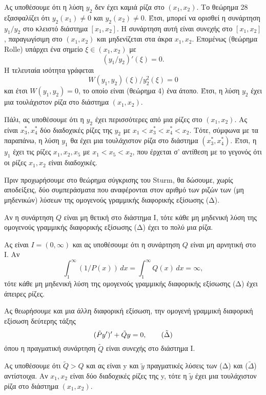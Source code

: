 \documentclass[11pt,a4paper,twoside]{book}
\newcommand{\titlefont}[1]{{\fontfamily{maksf}\selectfont #1}}
\newcounter{thewrhma}[chapter]
\renewcommand{\thethewrhma}{\thechapter.\arabic{thewrhma}}
\newcommand{\thewr}{\refstepcounter{thewrhma}{\bf\titlefont{\textcolor{secondarycolor}{\large Θεώρημα\hspace{2mm}\thethewrhma}}}\hspace{1mm}}{}
\newenvironment{Thewrhma}[1]
{\begin{tcolorbox}[title=\thewr\ \ :\ \  {\textcolor{black}{\bf{\large\titlefont{#1}}}},
breakable,
enhanced standard,
titlerule=-.2pt,
toprule=0pt, 
rightrule=0pt, 
bottomrule=0pt,
colback=white,
left=2mm,
top=1mm,
bottom=0mm,
boxrule=0pt,
colframe=white,
borderline west={1.5mm}{0pt}{secondarycolor},
leftrule=2mm,
sharp corners,
coltitle=secondarycolor]}
{\end{tcolorbox}}
\newcommand{\eng}[1]{\selectlanguage{english}#1\selectlanguage{greek}}
\begin{document}
Ας υποθέσουμε ότι η λύση $y_2$ δεν έχει καμιά ρίζα στο $(x_1,x_2)$. Το θεώρημα 28 εξασφαλίζει ότι $y_2(x_1)\neq 0$ και $y_2(x_2)\neq 0$. Έτσι, μπορεί να ορισθεί η συνάρτηση $y_1/y_2$ στο κλειστό διάστημα $[x_1,x_2]$. Η συνάρτηση αυτή είναι συνεχής στο $[x_1,x_2]$, παραγωγίσιμη στο $(x_1,x_2)$ και μηδενίζεται στα άκρα $x_1, x_2$. Επομένως (θεώρημα Rolle) υπάρχει ένα σημείο $\xi \in (x_1,x_2)$ με
\[ (y_1/y_2)'(\xi)=0. \]
Η τελευταία ισότητα γράφεται
\[ W(y_1,y_2)(\xi)/y_2^2(\xi)=0 \]
και έτσι $W(y_1,y_2)=0$, το οποίο είναι (θεώρημα 4) ένα άτοπο. Έτσι, η λύση $y_2$ έχει μια τουλάχιστον ρίζα στο διάστημα $(x_1,x_2)$.

Πάλι, ας υποθέσουμε ότι η $y_2$ έχει περισσότερες από μια ρίζες στο $(x_1,x_2)$. Ας είναι $x_3^*, x_4^*$ δύο διαδοχικές ρίζες της $y_2$ με $x_1<x_3^*<x_4^*<x_2$. Τότε, σύμφωνα με τα παραπάνω, η λύση $y_1$ θα έχει μια τουλάχιστον ρίζα στο διάστημα $(x_3^*,x_4^*)$. Έτσι, η $y_1$ έχει τις ρίζες $x_1,x_2,x_5$ με $x_1<x_5<x_2$, που έρχεται σ' αντίθεση με το γεγονός ότι οι ρίζες $x_1, x_2$ είναι διαδοχικές.

\vspace{5mm}
Πριν προχωρήσουμε στο θεώρημα σύγκρισης του \eng{Sturm}, θα δώσουμε, χωρίς αποδείξεις, δύο συμπεράσματα που αναφέρονται στον αριθμό των ριζών των (μη μηδενικών) λύσεων της ομογενούς γραμμικής διαφορικής εξίσωσης (Δ).
\begin{Alist}
    \item Αν η συνάρτηση $Q$ είναι μη θετική στο διάστημα I, τότε κάθε μη μηδενική λύση της ομογενούς γραμμικής διαφορικής εξίσωσης (Δ) έχει το πολύ μια ρίζα.
    \item Ας είναι $I=(0,\infty)$ και ας υποθέσουμε ότι η συνάρτηση $Q$ είναι μη αρνητική στο Ι. Αν
    \[ \int_1^\infty (1/P(x)) \, dx = \int_1^\infty Q(x) \, dx = \infty, \]
    τότε κάθε μη μηδενική λύση της ομογενούς γραμμικής διαφορικής εξίσωσης (Δ) έχει άπειρες ρίζες.
\end{Alist}
Ας θεωρήσουμε και μια άλλη διαφορική εξίσωση, την ομογενή γραμμική διαφορική εξίσωση δεύτερης τάξης
\begin{equation}
    (\tilde{P}y')'+\tilde{Q}y=0, \tag{$\tilde{\Delta}$}
\end{equation}
όπου η πραγματική συνάρτηση $\tilde{Q}$ είναι συνεχής στο διάστημα Ι.

\begin{Thewrhma}{30 (Θεώρημα σύγκρισης του \eng{Sturm})}
Ας υποθέσουμε ότι $\tilde{Q}>Q$ και ας είναι y και $\tilde{y}$ πραγματικές λύσεις των (Δ) και ($\tilde{\Delta}$) αντίστοιχα. Αν $x_1,x_2$ είναι δύο διαδοχικές ρίζες της y, τότε η $\tilde{y}$ έχει μια τουλάχιστον ρίζα στο διάστημα $(x_1,x_2)$.
\end{Thewrhma}
\end{document}
